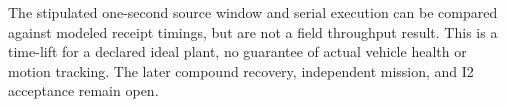 \documentclass{article}
\begin{document}
The stipulated one-second source window and serial execution
can be compared against modeled receipt timings, but are not
a field throughput result. This is a time-lift for a declared
ideal plant, no guarantee of actual vehicle health or motion
tracking. The later compound recovery, independent mission,
and I2 acceptance remain open.
\end{document}
